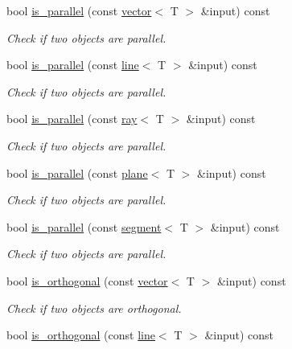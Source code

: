 \begin{DoxyCompactItemize}
bool \hyperlink{classddd_1_1plane_af5aca29c531998c539cd8df3236e81d7}{is\+\_\+parallel} (const \hyperlink{classddd_1_1vector}{vector}$<$ T $>$ \&input) const
\begin{DoxyCompactList}\small\item\em Check if two objects are parallel. \end{DoxyCompactList}\item 
bool \hyperlink{classddd_1_1plane_a07ebd469641fe441db7bf3ba67ea5e01}{is\+\_\+parallel} (const \hyperlink{classddd_1_1line}{line}$<$ T $>$ \&input) const
\begin{DoxyCompactList}\small\item\em Check if two objects are parallel. \end{DoxyCompactList}\item 
bool \hyperlink{classddd_1_1plane_a29f6dd828983c11764422814a86559ed}{is\+\_\+parallel} (const \hyperlink{classddd_1_1ray}{ray}$<$ T $>$ \&input) const
\begin{DoxyCompactList}\small\item\em Check if two objects are parallel. \end{DoxyCompactList}\item 
bool \hyperlink{classddd_1_1plane_af94adfd507e373307fea80b6c4061d80}{is\+\_\+parallel} (const \hyperlink{classddd_1_1plane}{plane}$<$ T $>$ \&input) const
\begin{DoxyCompactList}\small\item\em Check if two objects are parallel. \end{DoxyCompactList}\item 
bool \hyperlink{classddd_1_1plane_a4118eb93ecb24fcb6b76bfb22c10b451}{is\+\_\+parallel} (const \hyperlink{classddd_1_1segment}{segment}$<$ T $>$ \&input) const
\begin{DoxyCompactList}\small\item\em Check if two objects are parallel. \end{DoxyCompactList}\item 
bool \hyperlink{classddd_1_1plane_a3bea901b743fe8a941b1b6b89ad5f53e}{is\+\_\+orthogonal} (const \hyperlink{classddd_1_1vector}{vector}$<$ T $>$ \&input) const
\begin{DoxyCompactList}\small\item\em Check if two objects are orthogonal. \end{DoxyCompactList}\item 
bool \hyperlink{classddd_1_1plane_a0a9d52d43d074f00cc5f36d85bdc16b1}{is\+\_\+orthogonal} (const \hyperlink{classddd_1_1line}{line}$<$ T $>$ \&input) const

\end{DoxyCompactItemize}
